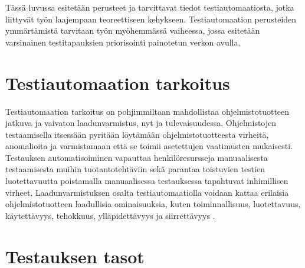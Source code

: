 Tässä luvussa esitetään perusteet ja tarvittavat tiedot testiautomaatiosta, jotka liittyvät työn laajempaan teoreettiseen kehykseen.
Testiautomaation perusteiden ymmärtämistä tarvitaan työn myöhemmässä vaiheessa, jossa esitetään varsinainen testitapauksien priorisointi painotetun verkon avulla.

\section{Testiautomaation tarkoitus} \label{07_testiautomaation_tarkoitus}

Testiautomaation tarkoitus on pohjimmiltaan mahdollistaa ohjelmistotuotteen jatkuva ja vaivaton laadunvarmistus, nyt ja tulevaisuudessa.
Ohjelmistojen testaamisella itsessään pyritään löytämään ohjelmistotuotteesta virheitä, anomalioita ja varmistamaan että se toimii asetettujen vaatimusten mukaisesti.
Testauksen automatisoiminen vapauttaa henkilöresursseja manuaalisesta testaamisesta muihin tuotantotehtäviin sekä parantaa toistuvien testien luotettavuutta poistamalla manuaalisessa testauksessa tapahtuvat inhimillisen virheet.
Laadunvarmistuksen osalta testiautomaatiolla voidaan kattaa erilaisia ohjelmistotuotteen laadullisia ominaisuuksia, kuten toiminnallisuus, luotettavuus, käytettävyys, tehokkuus, ylläpidettävyys ja siirrettävyys \parencite{iso_9126-1_2001}.

\section{Testauksen tasot} \label{07_testauksen_tasot}

